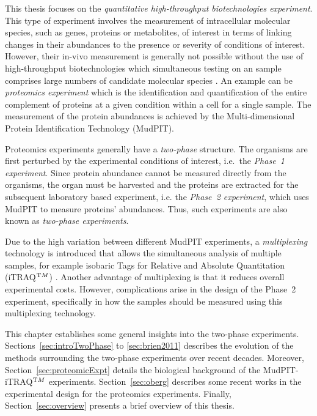 \documentclass[11pt,a4paper]{article}
\begin{document}
This thesis focuses on the \emph{quantitative high-throughput biotechnologies experiment}. This type of experiment involves the measurement of intracellular molecular species, such as genes, proteins or metabolites, of interest in terms of linking changes in their abundances to the presence or severity of conditions of interest. However, their in-vivo measurement is generally not possible without the use of high-throughput biotechnologies which simultaneous testing on an sample comprises large numbers of candidate molecular species \citep{Janzen2002}. An example can be \emph{proteomics experiment} which is the identification and quantification of the entire complement of proteins at a given condition within a cell for a single sample. The measurement of the protein abundances is achieved by the Multi-dimensional Protein Identification Technology (MudPIT). 

Proteomics experiments generally have a \emph{two-phase} structure. The organisms are first perturbed by the experimental conditions of interest, i.e.\ the \emph{Phase~1 experiment}. Since protein abundance cannot be measured directly from the organisms, the organ must be harvested and the proteins are extracted for the subsequent laboratory based experiment, i.e. the \emph{Phase~2 experiment}, which uses MudPIT to measure proteins' abundances. Thus, such experiments are also known as \emph{two-phase experiments}. 

Due to the high variation between different MudPIT experiments, a \emph{multiplexing} technology is introduced that allows the simultaneous analysis of multiple samples, for example isobaric Tags for Relative and Absolute Quantitation (iTRAQ$^{\textrm TM}$) \citep{Ross2004}. Another advantage of multiplexing is that it reduces overall experimental costs. However, complications arise in the design of the Phase~2 experiment, specifically in how the samples should be measured using this multiplexing technology. 

This chapter establishes some general insights into the two-phase experiments. Sections~\ref{sec:introTwoPhase} to \ref{sec:brien2011} describes the evolution of the methods surrounding the two-phase experiments over recent decades. Moreover, Section~\ref{sec:proteomicExpt} details the biological background of the MudPIT-iTRAQ$^{\textrm TM}$ experiments. Section~\ref{sec:oberg} describes some recent works in the experimental design for the proteomics experiments. Finally, Section~\ref{sec:overview} presents a brief overview of this thesis.
\end{document}
